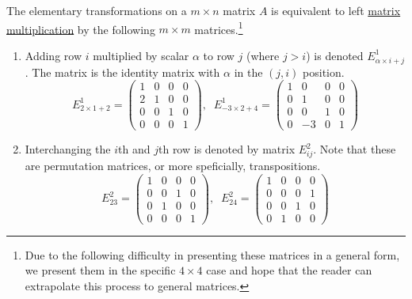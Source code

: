 	\begin{lemma}
	  \label{thm:elementary-row-transformations-as-matrix}
		The elementary transformations on a $m \times n$ matrix $A$ is equivalent to left \hyperref[def:matrix-multiplication]{matrix multiplication} by the following $m \times m$ matrices.\footnote{Due to the following difficulty in presenting these matrices in a general form, we present them in the specific $4 \times 4$ case and hope that the reader can extrapolate this process to general matrices. }

		\begin{enumerate}
			\item Adding row $i$ multiplied by scalar $\alpha$ to row $j$ (where $j > i$) is denoted $E^1_{\alpha \times i + j}$. The matrix is the identity matrix with $\alpha$ in the $(j, i)$ position. 
			\begin{equation}
				E^1_{2 \times 1 + 2} = \begin{pmatrix}
				1&0&0&0 \\ 2&1&0&0 \\ 0&0&1&0 \\ 0&0&0&1
				\end{pmatrix}, \;\; E^1_{-3 \times 2 + 4} = \begin{pmatrix}
				1&0&0&0 \\ 0&1&0&0 \\ 0&0&1&0 \\ 0&-3&0&1
				\end{pmatrix}
			\end{equation}
			\item Interchanging the $i$th and $j$th row is denoted by matrix $E^2_{i j}$. Note that these are permutation matrices, or more speficially, transpositions. 
			\begin{equation}
				E^2_{2 3} = \begin{pmatrix}
				1&0&0&0 \\ 0&0&1&0 \\ 0&1&0&0 \\ 0&0&0&1
				\end{pmatrix}, \; \; E^2_{2 4} = \begin{pmatrix}
				1&0&0&0 \\ 0&0&0&1 \\ 0&0&1&0 \\ 0&1&0&0
				\end{pmatrix}
			\end{equation}


\end{enumerate}
\end{lemma}
